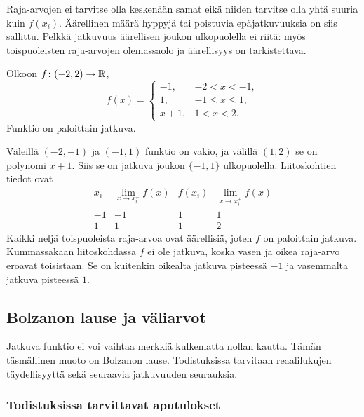 \documentclass[11pt,a4paper]{amsart}
\begin{document}
\begin{remark}
  Raja-arvojen ei tarvitse olla keskenään samat eikä niiden tarvitse
  olla yhtä suuria kuin $f(x_i)$. Äärellinen määrä hyppyjä tai
  poistuvia epäjatkuvuuksia on siis sallittu. Pelkkä jatkuvuus
  äärellisen joukon ulkopuolella ei riitä: myös toispuoleisten
  raja-arvojen olemassaolo ja äärellisyys on tarkistettava.
\end{remark}

\begin{example}
  Olkoon $f\colon(-2,2)\to\mathbb{R}$,
  \[
    f(x)=
    \begin{cases}
      -1,&-2<x<-1,\\
      1,&-1\le x\le1,\\
      x+1,&1<x<2.
    \end{cases}
  \]
  Funktio on paloittain jatkuva.
\end{example}
\begin{solution}
  Väleillä $(-2,-1)$ ja $(-1,1)$ funktio on vakio, ja välillä
  $(1,2)$ se on polynomi $x+1$. Siis se on jatkuva joukon
  $\{-1,1\}$ ulkopuolella. Liitoskohtien tiedot ovat
  \[
    \begin{array}{c|ccc}
      x_i & \displaystyle\lim_{x\to x_i^-}f(x)
      & f(x_i) & \displaystyle\lim_{x\to x_i^+}f(x)\\[2pt]
      \hline
      -1 & -1 & 1 & 1\\
      1 &  1 & 1 & 2
    \end{array}
  \]
  Kaikki neljä toispuoleista raja-arvoa ovat äärellisiä, joten
  $f$ on paloittain jatkuva. Kummassakaan liitoskohdassa $f$ ei
  ole jatkuva, koska vasen ja oikea raja-arvo eroavat toisistaan.
  Se on kuitenkin oikealta jatkuva pisteessä $-1$ ja vasemmalta
  jatkuva pisteessä $1$.
\end{solution}

\newpage
\subsection{Bolzanon lause ja väliarvot}

Jatkuva funktio ei voi vaihtaa merkkiä kulkematta nollan kautta.
Tämän täsmällinen muoto on Bolzanon lause. Todistuksissa tarvitaan
reaalilukujen täydellisyyttä sekä seuraavia jatkuvuuden seurauksia.

\subsubsection*{Todistuksissa tarvittavat aputulokset}
\end{document}
